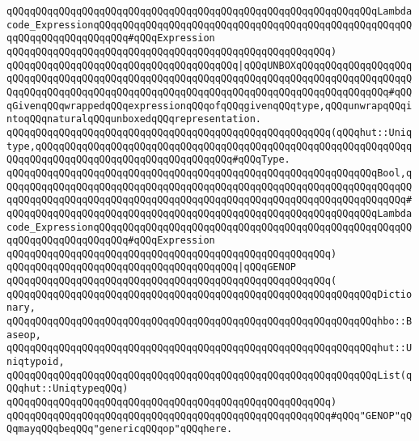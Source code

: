 \verb|qQQqqQQqqQQqqQQqqQQqqQQqqQQqqQQqqQQqqQQqqQQqqQQqqQQqqQQqqQQqqQQqLambdacode_ExpressionqQQqqQQqqQQqqQQqqQQqqQQqqQQqqQQqqQQqqQQqqQQqqQQqqQQqqQQqqQQqqQQqqQQqqQQqqQQq#qQQqExpression|\newline
\verb|qQQqqQQqqQQqqQQqqQQqqQQqqQQqqQQqqQQqqQQqqQQqqQQqqQQqqQQq)|\newline
\verb|qQQqqQQqqQQqqQQqqQQqqQQqqQQqqQQqqQQqqQQq|\verb#|qQQqUNBOXqQQqqQQqqQQqqQQqqQQqqQQqqQQqqQQqqQQqqQQqqQQqqQQqqQQqqQQqqQQqqQQqqQQqqQQqqQQqqQQqqQQqqQQqqQQqqQQqqQQqqQQqqQQqqQQqqQQqqQQqqQQqqQQqqQQqqQQqqQQqqQQqqQQqqQQqqQQq#\verb|#qQQqGivenqQQqwrappedqQQqexpressionqQQqofqQQqgivenqQQqtype,qQQqunwrapqQQqintoqQQqnaturalqQQqunboxedqQQqrepresentation.|\newline
\verb|qQQqqQQqqQQqqQQqqQQqqQQqqQQqqQQqqQQqqQQqqQQqqQQqqQQqqQQq(qQQqhut::Uniqtype,qQQqqQQqqQQqqQQqqQQqqQQqqQQqqQQqqQQqqQQqqQQqqQQqqQQqqQQqqQQqqQQqqQQqqQQqqQQqqQQqqQQqqQQqqQQqqQQqqQQqqQQq#qQQqType.|\newline
\verb|qQQqqQQqqQQqqQQqqQQqqQQqqQQqqQQqqQQqqQQqqQQqqQQqqQQqqQQqqQQqqQQqBool,qQQqqQQqqQQqqQQqqQQqqQQqqQQqqQQqqQQqqQQqqQQqqQQqqQQqqQQqqQQqqQQqqQQqqQQqqQQqqQQqqQQqqQQqqQQqqQQqqQQqqQQqqQQqqQQqqQQqqQQqqQQqqQQqqQQqqQQqqQQq#|\newline
\verb|qQQqqQQqqQQqqQQqqQQqqQQqqQQqqQQqqQQqqQQqqQQqqQQqqQQqqQQqqQQqqQQqLambdacode_ExpressionqQQqqQQqqQQqqQQqqQQqqQQqqQQqqQQqqQQqqQQqqQQqqQQqqQQqqQQqqQQqqQQqqQQqqQQqqQQq#qQQqExpression|\newline
\verb|qQQqqQQqqQQqqQQqqQQqqQQqqQQqqQQqqQQqqQQqqQQqqQQqqQQqqQQq)|\newline
\newline
\newline
\verb|qQQqqQQqqQQqqQQqqQQqqQQqqQQqqQQqqQQqqQQq|\verb#|qQQqGENOP#\newline
\verb|qQQqqQQqqQQqqQQqqQQqqQQqqQQqqQQqqQQqqQQqqQQqqQQqqQQqqQQq(|\newline
\verb|qQQqqQQqqQQqqQQqqQQqqQQqqQQqqQQqqQQqqQQqqQQqqQQqqQQqqQQqqQQqqQQqDictionary,|\newline
\verb|qQQqqQQqqQQqqQQqqQQqqQQqqQQqqQQqqQQqqQQqqQQqqQQqqQQqqQQqqQQqqQQqhbo::Baseop,|\newline
\verb|qQQqqQQqqQQqqQQqqQQqqQQqqQQqqQQqqQQqqQQqqQQqqQQqqQQqqQQqqQQqqQQqhut::Uniqtypoid,|\newline
\verb|qQQqqQQqqQQqqQQqqQQqqQQqqQQqqQQqqQQqqQQqqQQqqQQqqQQqqQQqqQQqqQQqList(qQQqhut::UniqtypeqQQq)|\newline
\verb|qQQqqQQqqQQqqQQqqQQqqQQqqQQqqQQqqQQqqQQqqQQqqQQqqQQqqQQq)|\newline
\verb|qQQqqQQqqQQqqQQqqQQqqQQqqQQqqQQqqQQqqQQqqQQqqQQqqQQqqQQq#qQQq"GENOP"qQQqmayqQQqbeqQQq"genericqQQqop"qQQqhere.|\newline

